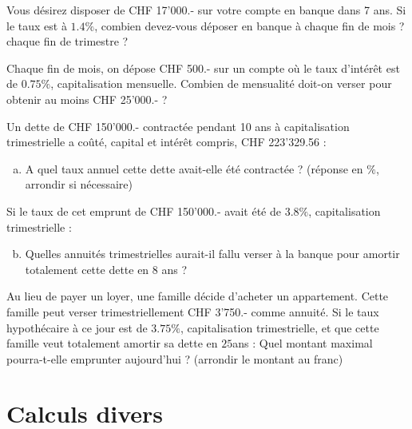 \documentclass[twoside, a4paper, 12pt, openright, fullpage]{book}
\begin{document}
\begin{exercice}\label{mensualite2}
Vous désirez disposer de CHF 17'000.- sur votre compte en banque dans 7 ans. Si le taux est à $1.4\%$, combien devez-vous déposer en banque à chaque fin de mois ? chaque fin de trimestre ?
\end{exercice}

\begin{exercice}\label{mensualite3}
Chaque fin de mois, on dépose CHF 500.- sur un compte où le taux d'intérêt est de $0.75\%$, capitalisation mensuelle. Combien de mensualité doit-on verser pour obtenir au moins CHF 25'000.- ?
\end{exercice}

\begin{exercice}\label{mensualite4} %
Un dette de CHF 150'000.- contractée pendant 10 ans à capitalisation trimestrielle a coûté, capital et intérêt compris, CHF 223'329.56 :
\begin{enumerate}[a)]
    \item A quel taux annuel cette dette avait-elle été contractée ? (réponse en $\%$, arrondir si nécessaire)
\end{enumerate}
Si le taux de cet emprunt de CHF 150'000.- avait été de $3.8\%$, capitalisation trimestrielle :
\begin{enumerate}[a)]
\setcounter{enumi}{1}
    \item Quelles annuités trimestrielles aurait-il fallu verser à  la banque pour amortir totalement cette dette en 8 ans ?
\end{enumerate}
\end{exercice}

\begin{exercice}\label{mensualite5}
Au lieu de payer un loyer, une famille décide d'acheter un appartement. Cette famille peut verser trimestriellement CHF 3'750.- comme annuité. Si le taux hypothécaire à ce jour est de $3.75\%$, capitalisation trimestrielle, et que cette famille veut totalement amortir sa dette en $25$ans : Quel montant maximal pourra-t-elle emprunter aujourd'hui ? (arrondir le montant au franc)
\end{exercice}

\section{Calculs divers}
\end{document}
